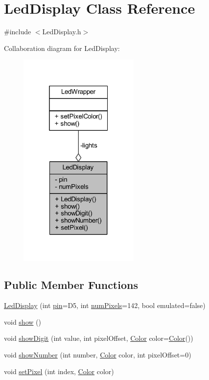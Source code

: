 \hypertarget{class_led_display}{}\section{Led\+Display Class Reference}
\label{class_led_display}


{\ttfamily \#include $<$Led\+Display.\+h$>$}



Collaboration diagram for Led\+Display\+:
\nopagebreak
\begin{figure}[H]
\begin{center}
\leavevmode
\includegraphics[width=169pt]{class_led_display__coll__graph}
\end{center}
\end{figure}
\subsection*{Public Member Functions}
\begin{DoxyCompactItemize}
\item 
\hyperlink{class_led_display_a5399399b88b224912bbebbb5e4b36737}{Led\+Display} (int \hyperlink{class_led_display_ada84aea1dfd3e348efd492dfdccf596d}{pin}=D5, int \hyperlink{class_led_display_aef7ced23d44c457c19c3d0f4f88af940}{num\+Pixels}=142, bool emulated=false)
\item 
void \hyperlink{class_led_display_a497d2686d902d16ae001173486dcb7ab}{show} ()
\item 
void \hyperlink{class_led_display_a4e8fd0added33e4ba163bff5bbc8cd69}{show\+Digit} (int value, int pixel\+Offset, \hyperlink{struct_color}{Color} color=\hyperlink{struct_color}{Color}())
\item 
void \hyperlink{class_led_display_a673f0b08b216cc8a02a8a70fbbc54687}{show\+Number} (int number, \hyperlink{struct_color}{Color} color, int pixel\+Offset=0)
\item 
void \hyperlink{class_led_display_ab2333aa2ee8c8aa328917755249d440b}{set\+Pixel} (int index, \hyperlink{struct_color}{Color} color)
\end{DoxyCompactItemize}
